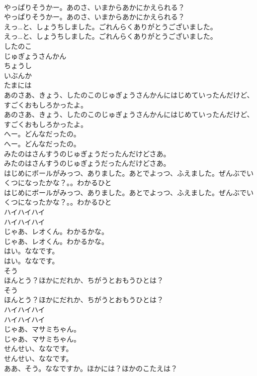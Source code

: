 \documentclass[8pt]{extreport}
\begin{document}
\begin{CJK}{UTF8}{min}
\\	やっぱりそうかー。あのさ、いまからあかにかえられる？
\\	やっぱりそうかー。あのさ、いまからあかにかえられる？
\\	えっ…と、しょうちしました。ごれんらくありがとうございました。
\\	えっ…と、しょうちしました。ごれんらくありがとうございました。
\\	したのこ
\\	じゅぎょうさんかん
\\	ちょうし
\\	いぶんか
\\	たまには
\\	あのさあ、きょう、したのこのじゅぎょうさんかんにはじめていったんだけど、すごくおもしろかったよ。
\\	あのさあ、きょう、したのこのじゅぎょうさんかんにはじめていったんだけど、すごくおもしろかったよ。
\\	へー。どんなだったの。
\\	へー。どんなだったの。
\\	みたのはさんすうのじゅぎょうだったんだけどさあ。
\\	みたのはさんすうのじゅぎょうだったんだけどさあ。
\\	はじめにボールがみっつ、ありました。あとでよっつ、ふえました。ぜんぶでいくつになったかな？。。わかるひと
\\	はじめにボールがみっつ、ありました。あとでよっつ、ふえました。ぜんぶでいくつになったかな？。。わかるひと
\\	ハイハイハイ
\\	ハイハイハイ
\\	じゃあ、レオくん。わかるかな。
\\	じゃあ、レオくん。わかるかな。
\\	はい。ななです。
\\	はい。ななです。
\\	そう
\\	ほんとう？ほかにだれか、ちがうとおもうひとは？
\\	そう
\\	ほんとう？ほかにだれか、ちがうとおもうひとは？
\\	ハイハイハイ
\\	ハイハイハイ
\\	じゃあ、マサミちゃん。
\\	じゃあ、マサミちゃん。
\\	せんせい、ななです。
\\	せんせい、ななです。
\\	ああ、そう。ななですか。ほかには？ほかのこたえは？

\end{CJK}
\end{document}

